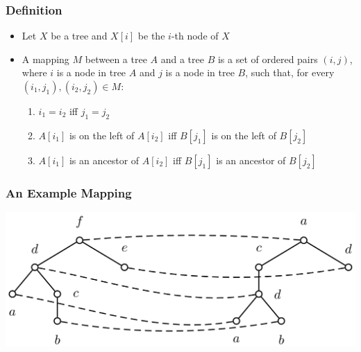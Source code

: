 \documentclass[svgnames]{beamer}
\begin{document}

\begin{frame} \frametitle{Definition}
  
  \begin{block}{}
    \begin{itemize}
    \item Let $X$ be a tree and $X[i]$ be the $i$-th node of $X$
    \item A mapping $M$ between a tree $A$ and a tree $B$ is a set of ordered
      pairs $(i,j)$, where $i$ is a node in tree $A$ and $j$ is a node in tree
      $B$, such that, for every $(i_1,j_1),(i_2,j_2) \in M$:
      \begin{enumerate}
      \item $i_1 = i_2$ iff $j_1 = j_2$
      \item $A[i_1]$ is on the left of $A[i_2]$ iff $B[j_1]$ is on the left of
        $B[j_2]$
      \item $A[i_1]$ is an ancestor of $A[i_2]$ iff $B[j_1]$ is an ancestor of
        $B[j_2]$
      \end{enumerate}
    \end{itemize}
  \end{block}

\end{frame}


\begin{frame} \frametitle{An Example Mapping}

  \centering
  \includegraphics[width=\linewidth]{mapping}

\end{frame}

\end{document}

